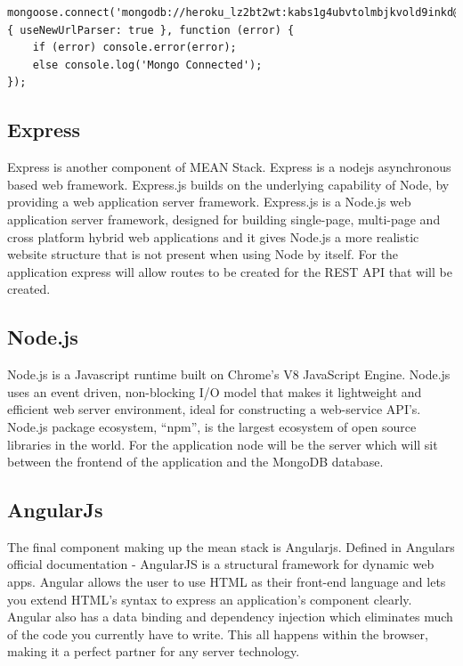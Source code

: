 \begin{verbatim}
mongoose.connect('mongodb://heroku_lz2bt2wt:kabs1g4ubvtolmbjkvold9inkd@ds227185.mlab.com:27185/heroku_lz2bt2wt',{ useNewUrlParser: true }, function (error) {
    if (error) console.error(error);
    else console.log('Mongo Connected');
});
\end{verbatim}


\subsection{Express}
Express is another component of MEAN Stack. Express is a nodejs asynchronous based web framework. Express.js builds on the underlying capability of Node, by providing a web application server framework. Express.js is a Node.js web application server framework, designed for building single-page, multi-page and cross platform hybrid web applications and it gives Node.js a more realistic website structure that is not present when using Node by itself. For the application express will allow routes to be created for the REST API that will be created.\cite{expressjs}
\subsection{Node.js}

Node.js is a Javascript runtime built on Chrome’s V8 JavaScript Engine.
Node.js uses an event driven, non-blocking I/O model that makes it lightweight
and efficient web server environment, ideal for constructing a web-service
API’s. Node.js package ecosystem, “npm”, is the largest ecosystem of open
source libraries in the world. For the application node will be the server which will sit between the frontend of the application and the MongoDB database.\cite{nodejs}

\subsection{AngularJs}
The final component making up the mean stack is Angularjs. Defined in Angulars official documentation\cite{angularjs} - AngularJS is a structural framework for dynamic
web apps. Angular allows the user to use HTML as their front-end language and lets you extend HTML’s syntax to express an application’s component clearly. Angular also has a data binding and dependency injection which eliminates much
of the code you currently have to write. This all happens within the
browser, making it a perfect partner for any server technology.


